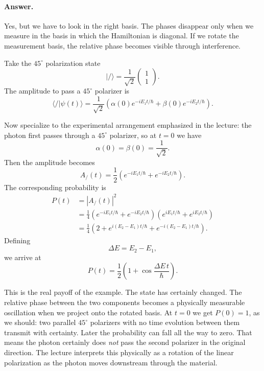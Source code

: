 \paragraph{Answer.}
Yes, but we have to look in the right basis. The phases disappear only when we measure in the basis in which the Hamiltonian is diagonal. If we rotate the measurement basis, the relative phase becomes visible through interference.

Take the $45^\circ$ polarization state
\begin{equation}
|/\rangle
=
\frac{1}{\sqrt2}
\begin{pmatrix}
1\\
1
\end{pmatrix}.
\end{equation}
The amplitude to pass a $45^\circ$ polarizer is
\begin{equation}
\langle /|\psi(t)\rangle
=
\frac{1}{\sqrt2}
\left(
\alpha(0)e^{-iE_1 t/\hbar}
+
\beta(0)e^{-iE_2 t/\hbar}
\right).
\end{equation}

Now specialize to the experimental arrangement emphasized in the lecture: the photon first passes through a $45^\circ$ polarizer, so at $t=0$ we have
\begin{equation}
\alpha(0)=\beta(0)=\frac{1}{\sqrt2}.
\end{equation}
Then the amplitude becomes
\begin{equation}
A_{/}(t)
=
\frac12
\left(
e^{-iE_1 t/\hbar}
+
e^{-iE_2 t/\hbar}
\right).
\end{equation}
The corresponding probability is
\begin{align}
P(t)
&=
|A_{/}(t)|^2 \\
&=
\frac14
\left(
e^{-iE_1 t/\hbar}+e^{-iE_2 t/\hbar}
\right)
\left(
e^{iE_1 t/\hbar}+e^{iE_2 t/\hbar}
\right) \\
&=
\frac14
\left(
2
+
e^{i(E_2-E_1)t/\hbar}
+
e^{-i(E_2-E_1)t/\hbar}
\right).
\end{align}
Defining
\begin{equation}
\Delta E=E_2-E_1,
\end{equation}
we arrive at
\begin{equation}
P(t)=\frac12\left(1+\cos\frac{\Delta E\,t}{\hbar}\right).
\end{equation}

This is the real payoff of the example. The state has certainly changed. The relative phase between the two components becomes a physically measurable oscillation when we project onto the rotated basis. At $t=0$ we get $P(0)=1$, as we should: two parallel $45^\circ$ polarizers with no time evolution between them transmit with certainty. Later the probability can fall all the way to zero. That means the photon certainly does \emph{not} pass the second polarizer in the original direction. The lecture interprets this physically as a rotation of the linear polarization as the photon moves downstream through the material.

